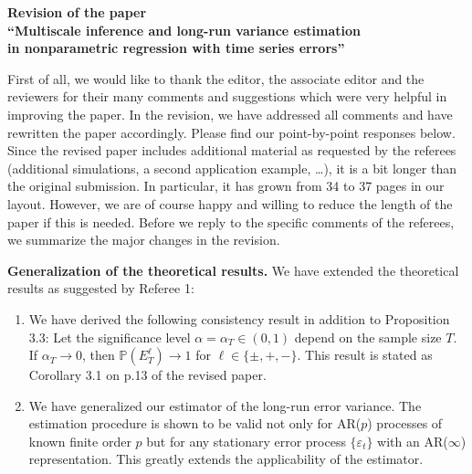 \documentclass[a4paper,12pt]{article}
\begin{document}
\begin{center} 
{\large \bf Revision of the paper} \\[0.1cm]
{\large \bf ``Multiscale inference and long-run variance estimation} \\[0.1cm]
{\large \bf in nonparametric regression with time series errors''} 
\end{center}
\vspace{7pt}



First of all, we would like to thank the editor, the associate editor and the reviewers for their many comments and suggestions which were very helpful in improving the paper. In the revision, we have addressed all comments and have rewritten the paper accordingly. Please find our point-by-point responses below. 
Since the revised paper includes additional material as requested by the referees (additional simulations, a second application example, \dots), it is a bit longer than the original submission. In particular, it has grown from 34 to 37 pages in our layout. However, we are of course happy and willing to reduce the length of the paper 
if this is needed. 
Before we reply to the specific comments of the referees, we summarize the major changes in the revision.

\vspace{10pt}


\textbf{Generalization of the theoretical results.} We have extended the theoretical results as suggested by Referee 1:
\begin{enumerate}[label=(\roman*), leftmargin=0.8cm]

\item We have derived the following consistency result in addition to Proposition 3.3: Let the significance level $\alpha = \alpha_T \in (0,1)$ depend on the sample size $T$. If $\alpha_T \rightarrow 0$, then $\mathbb{P}({E}_T^{\ell}) \rightarrow 1$ for $\ell \in \{ \pm,+,- \}$. This result is stated as Corollary 3.1 on p.13 of the revised paper. 

\item We have generalized our estimator of the long-run error variance. The estimation procedure is shown to be valid not only for AR($p$) processes of known finite order $p$ but for any stationary error process $\{\varepsilon_t\}$ with an AR($\infty$) representation. This greatly extends the applicability of the estimator. 
\end{enumerate}
\vspace{3pt}
\end{document}
